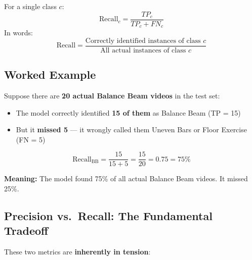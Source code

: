 \documentclass[12pt, a4paper]{article}
\begin{document}
\begin{formulabox}
For a single class $c$:
\[
\boxed{\text{Recall}_c = \frac{TP_c}{TP_c + FN_c}}
\]
In words:
\[
\text{Recall} = \frac{\text{Correctly identified instances of class } c}{\text{All actual instances of class } c}
\]
\end{formulabox}

\subsection{Worked Example}

\begin{examplebox}
Suppose there are \textbf{20 actual Balance Beam videos} in the test set:
\begin{itemize}
    \item The model correctly identified \textbf{15 of them} as Balance Beam (TP = 15)
    \item But it \textbf{missed 5} --- it wrongly called them Uneven Bars or Floor Exercise (FN = 5)
\end{itemize}

\[
\text{Recall}_{\text{BB}} = \frac{15}{15 + 5} = \frac{15}{20} = 0.75 = 75\%
\]

\textbf{Meaning:} The model found 75\% of all actual Balance Beam videos. It missed 25\%.
\end{examplebox}

\subsection{Precision vs.\ Recall: The Fundamental Tradeoff}

These two metrics are \textbf{inherently in tension}:

\begin{center}
\end{center}
\end{document}
